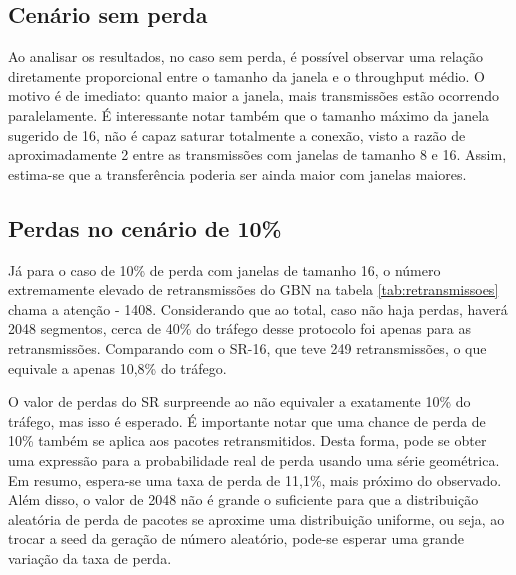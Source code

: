 \documentclass[11pt,a4paper]{article}
\begin{document}
\subsection{Cenário sem perda}
Ao analisar os resultados, no caso sem perda, é possível observar uma relação diretamente proporcional entre o tamanho da janela e o throughput médio.
O motivo é de imediato: quanto maior a janela, mais transmissões estão ocorrendo paralelamente.
É interessante notar também que o tamanho máximo da janela sugerido de 16, não é capaz saturar totalmente a conexão, 
visto a razão de aproximadamente 2 entre as transmissões com janelas de tamanho 8 e 16. Assim, estima-se que a transferência poderia ser ainda maior com janelas maiores.

\subsection{Perdas no cenário de 10\%}
Já para o caso de 10\% de perda com janelas de tamanho 16, 
o número extremamente elevado de retransmissões do GBN na tabela \ref{tab:retransmissoes} chama a atenção - 1408.
Considerando que ao total, caso não haja perdas, haverá 2048 segmentos, cerca de 40\% do tráfego desse protocolo foi apenas para as retransmissões.
Comparando com o SR-16, que teve 249 retransmissões, o que equivale a apenas 10,8\% do tráfego.

O valor de perdas do SR surpreende ao não equivaler a exatamente 10\% do tráfego, mas isso é esperado. 
É importante notar que uma chance de perda de 10\% também se aplica aos pacotes retransmitidos. Desta forma, pode se obter uma expressão 
para a probabilidade real de perda usando uma série geométrica. Em resumo, espera-se uma taxa de perda de 11,1\%, mais próximo do observado.
Além disso, o valor de 2048 não é grande o suficiente para que a distribuição aleatória de perda de pacotes se aproxime uma distribuição uniforme,
ou seja, ao trocar a seed da geração de número aleatório, pode-se esperar uma grande variação da taxa de perda.

\end{document}
